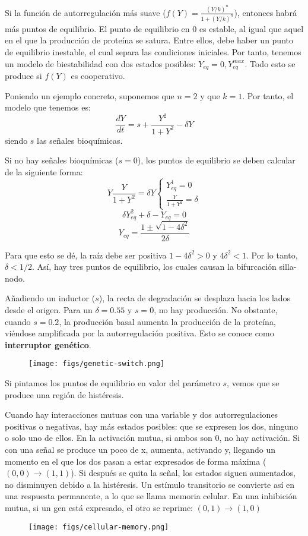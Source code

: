 Si la función de autorregulación más suave ($f(Y) = \frac{(Y/k)^n}{1 + (Y/k)^n}$), entonces habrá más puntos de equilibrio. El punto de equilibrio en 0 es estable, al igual que aquel en el que la producción de proteína se satura. Entre ellos, debe haber un punto de equilibrio inestable, el cual separa las condiciones iniciales. Por tanto, tenemos un modelo de biestabilidad con dos estados posibles: $Y_{eq} = 0, Y_{eq}^{max}$. Todo esto se produce si $f(Y)$ es cooperativo. 

Poniendo un ejemplo concreto, suponemos que $n = 2$ y que $k = 1$. Por tanto, el modelo que tenemos es:
$$\frac{dY}{dt} = s + \frac{Y^2}{1 + Y^2} - \delta Y$$
siendo $s$ las señales bioquímicas. 

Si no hay señales bioquímicas ($s=0$), los puntos de equilibrio se deben calcular de la siguiente forma:
$$Y \frac{Y}{1 + Y^2} = \delta Y \begin{cases}
Y^1_{eq} = 0 \\
\frac{Y}{1 + Y^2} = \delta
\end{cases}
$$
$$\delta Y^2_{eq} + \delta - Y_{eq} = 0$$
$$Y_{eq} = \frac{1 \pm \sqrt{1 - 4 \delta^2}}{2 \delta}$$

Para que esto se dé, la raíz debe ser positiva $1 - 4 \delta^2 > 0 $ y $4 \delta^2 < 1$. Por lo tanto, $\delta < 1/2$. Así, hay tres puntos de equilibrio, los cuales causan la bifurcación silla-nodo. 

Añadiendo un inductor ($s$), la recta de degradación se desplaza hacia los lados desde el origen. Para un $\delta = 0.55$ y $s=0$, no hay producción. No obstante, cuando $s = 0.2$, la producción basal aumenta la producción de la proteína, viéndose amplificada por la autorregulación positiva. Esto se conoce como \textbf{interruptor genético}.  

\begin{figure}[h]
\centering
\texttt{[image: figs/genetic-switch.png]}
\end{figure}

Si pintamos los puntos de equilibrio en valor del parámetro $s$, vemos que se produce una región de histéresis. 

Cuando hay interacciones mutuas con una variable y dos autorregulaciones positivas o negativas, hay más estados posibles: que se expresen los dos, ninguno o solo uno de ellos. En la activación mutua, si ambos son 0, no hay activación. Si con una señal se produce un poco de x, aumenta, activando y, llegando un momento en el que los dos pasan a estar expresados de forma máxima ($(0,0) \rightarrow (1,1)$). Si después se quita la señal, los estados siguen aumentados, no disminuyen debido a la histéresis. Un estímulo transitorio se convierte así en una respuesta permanente, a lo que se llama memoria celular. En una inhibición mutua, si un gen está expresado, el otro se reprime: $(0,1) \rightarrow (1,0)$
\begin{figure}[h]
\centering
\texttt{[image: figs/cellular-memory.png]}
\end{figure}

